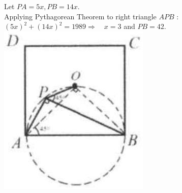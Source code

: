 \documentclass{article}
\begin{document}
Let \(P A=5 x, P B=14 x\).\\
Applying Pythagorean Theorem to right triangle \(A P B\) :\\
\((5 x)^{2}+(14 x)^{2}=1989 \Rightarrow \quad x=3\) and \(P B=42\).\\
\centering
\includegraphics[width=\textwidth]{images/reasoning_image_1.jpg}
\end{document}
